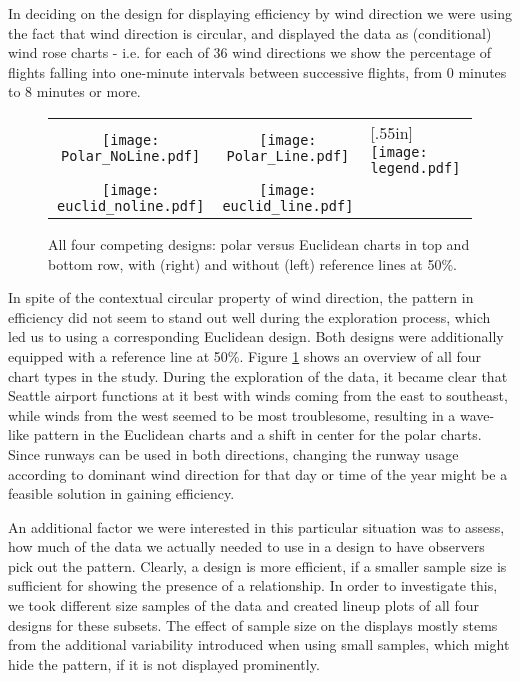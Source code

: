 In deciding on the design for displaying efficiency by wind direction we were using the fact that wind direction is circular, and  displayed the data as (conditional) wind rose charts - i.e. for each of 36 wind directions we show the percentage of flights falling into one-minute intervals between successive flights, from  0 minutes to 8 minutes or more.

\begin{figure}[htbp] %
 \hspace{-.1in}
   \begin{tabular}{ccl}
   \texttt{[image: Polar\_NoLine.pdf]} &  \hspace{-.3in}
   \texttt{[image: Polar\_Line.pdf]}  &  \hspace{-.2in} \multirow{2}{*}[.55in]{  \texttt{[image: legend.pdf]}} \\
   \texttt{[image: euclid\_noline.pdf]} & \hspace{-.3in}
   \texttt{[image: euclid\_line.pdf]}
   \end{tabular}
   \caption{All four competing designs: polar versus Euclidean charts in top and bottom row, with (right) and without (left) reference lines at 50\%. }
   \label{layouts}
\end{figure}

In spite of the contextual circular property of wind direction, the pattern in efficiency did not seem to stand out well during the exploration process, which led us to using a corresponding  Euclidean design. Both designs were additionally equipped with a reference line at 50\%. 
Figure \ref{layouts} shows an overview of all four chart types in the study. During the exploration of the data, it became clear that Seattle airport functions at it best with winds coming from the east to southeast, while winds from the west seemed to be most troublesome, resulting in a wave-like pattern in the Euclidean charts and a shift in center for the polar charts. Since runways can be used in both directions, changing the runway usage according to dominant wind direction for that day or time of the year might be a feasible solution in gaining efficiency. 

An additional factor we were interested in this particular situation was to assess, how much of the data we actually needed to use in a design to have observers pick out the pattern. Clearly, a design is more efficient, if a smaller sample size is sufficient for showing the presence of a relationship. In order to investigate this, we took different size samples of the data and created lineup plots of all four designs for these subsets. The effect of sample size on the displays mostly stems from the additional variability introduced when using small samples, which might hide the pattern, if it is not displayed prominently. 

